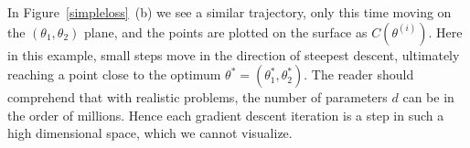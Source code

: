 In Figure~\ref{simpleloss}~(b) we see a similar trajectory, only this time moving on the $(\theta_1, \theta_2)$ plane, and the points are plotted on the surface as $C(\theta^{(i)})$. Here in this example, small steps move in the direction of steepest descent, ultimately reaching a point close to the optimum $\theta^* = (\theta_1^*, \theta_2^*)$. The reader should comprehend that with realistic problems, the number of parameters $d$ can be in the order of millions. Hence each gradient descent iteration is a step in such a high dimensional space, which we cannot visualize. 
